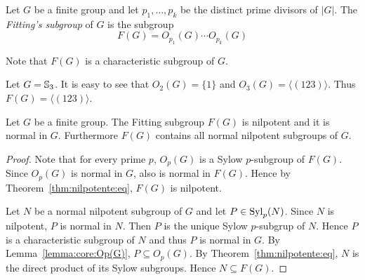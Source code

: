 %

\begin{definition}
	Let $G$ be a finite group and let $p_1,\dots,p_k$ be the distinct prime divisors of	$|G|$.  
	The {\em Fitting's subgroup} of $G$ is the subgroup
	\[
		F(G)=O_{p_1}(G)\cdots O_{p_k}(G)
	\]
\end{definition}

Note that $F(G)$ is a characteristic subgroup of $G$.



\begin{example}
	Let $G=\mathbb{S}_3$. It is easy to see that $O_2(G)=\{1\}$ and $O_3(G)=\langle
	(123)\rangle$. Thus $F(G)=\langle (123)\rangle$.
\end{example}

\begin{theorem}[Fitting]
	\label{theorem:Fitting}
	Let $G$ be a finite group. The Fitting subgroup $F(G)$ is nilpotent and it is normal in $G$. 
	Furthermore $F(G)$ contains all normal nilpotent subgroups of
	$G$.
\end{theorem}

\begin{proof}
	Note that for every prime $p$, $O_p(G)$ is a Sylow $p$-subgroup of $F(G)$. Since $O_p(G)$ is normal in $G$, also is normal in $F(G)$. Hence by Theorem~\ref{thm:nilpotente:eq}, $F(G)$ is
	nilpotent. 

	Let $N$ be a normal nilpotent subgroup of $G$ and let $P\in\mathrm{Syl}_p(N)$. Since
	$N$ is nilpotent, $P$ is normal in $N$. Then $P$ is the unique
	Sylow $p$-subgrup of $N$. Hence $P$ is a characteristic subgroup of $N$ and thus
	$P$ is normal in $G$. By Lemma~\ref{lemma:core:Op(G)}, $P\subseteq O_p(G)$. By Theorem~\ref{thm:nilpotente:eq}, $N$ is the direct product of its Sylow subgroups. Hence $N\subseteq F(G)$.
\end{proof}


